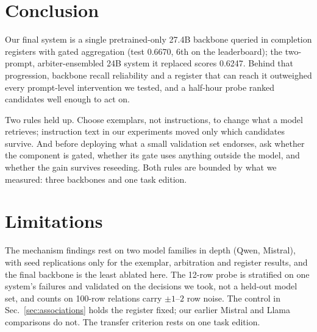 \documentclass[11pt]{article}
\begin{document}
\section{Conclusion}

Our final system is a single pretrained-only 27.4B backbone queried in
completion registers with gated aggregation (test 0.6670, 6th on the
leaderboard); the two-prompt, arbiter-ensembled 24B system it replaced
scores 0.6247. Behind that progression, backbone recall reliability and a
register that can reach it outweighed every prompt-level intervention we
tested, and a half-hour probe ranked candidates well enough to act on.

Two rules held up. Choose exemplars, not instructions, to change what a
model retrieves; instruction text in our experiments moved only which
candidates survive. And before deploying what a small validation set
endorses, ask whether the component is gated, whether its gate uses
anything outside the model, and whether the gain survives reseeding.
Both rules are bounded by what we measured: three backbones and one task
edition.

\section*{Limitations}

The mechanism findings rest on two model families in depth (Qwen,
Mistral), with seed replications only for the exemplar, arbitration and
register results, and the final backbone is the least ablated here. The
12-row probe is stratified on one system's failures and validated on the
decisions we took, not a held-out model set, and counts on 100-row
relations carry $\pm1$--$2$ row noise. The control in
Sec.~\ref{sec:associations} holds the register fixed; our earlier Mistral
and Llama comparisons do not. The transfer criterion rests on one task edition.


\end{document}
